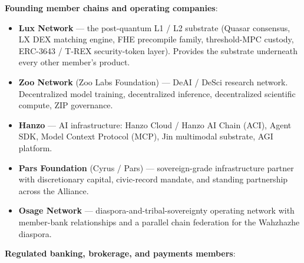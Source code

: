 \textbf{Founding member chains and operating companies}:

\begin{itemize}[leftmargin=2em,itemsep=0.1em]
\item \textbf{Lux Network} --- the post-quantum L1 / L2 substrate
(Quasar consensus, LX DEX matching engine, FHE precompile family,
threshold-MPC custody, ERC-3643 / T-REX security-token layer).
Provides the substrate underneath every other member's product.
\item \textbf{Zoo Network} (Zoo Labs Foundation) --- DeAI / DeSci
research network. Decentralized model training, decentralized
inference, decentralized scientific compute, ZIP governance.
\item \textbf{Hanzo} --- AI infrastructure: Hanzo Cloud / Hanzo AI
Chain (ACI), Agent SDK, Model Context Protocol (MCP), Jin
multimodal substrate, AGI platform.
\item \textbf{Pars Foundation} (Cyrus / Pars) --- sovereign-grade
infrastructure partner with discretionary capital, civic-record
mandate, and standing partnership across the Alliance.
\item \textbf{Osage Network} --- diaspora-and-tribal-sovereignty
operating network with member-bank relationships and a parallel
chain federation for the Wahzhazhe diaspora.
\end{itemize}

\textbf{Regulated banking, brokerage, and payments members}:

